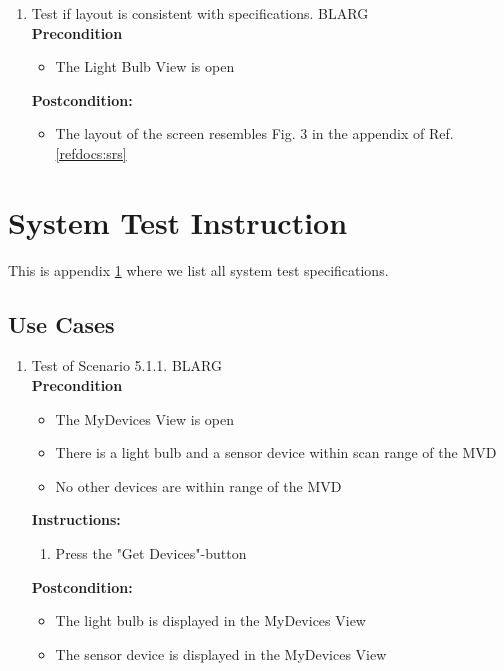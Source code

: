 \documentclass[a4paper]{article}
\newlength{\testlabellength}
\newenvironment{testlist}{\begin{enumerate}[label=\bfseries Instruction \thesubsection.\arabic* , labelindent=0pt, labelwidth=\testlabellength , leftmargin=2cm]}{\end{enumerate}}
\newenvironment{precondition}{
{\color{white}BLARG}\\ 
\textbf{Precondition}
\begin{itemize}[labelindent=0cm, labelwidth=2cm , leftmargin=1cm]
}
{\end{itemize}}
\newenvironment{instruction}{
\textbf{Instructions:}
\begin{enumerate}[label=\bfseries  \arabic*., labelindent=0cm, labelwidth=2cm , leftmargin=1cm]
}
{\end{enumerate}}
\newenvironment{postcondition}{
\textbf{Postcondition:}
\begin{itemize}[labelindent=0cm, labelwidth=2cm , leftmargin=1cm]
}
{\end{itemize}}
\begin{document}
\begin{appendices}
\begin{testlist}
	\item Test if layout is consistent with specifications.
		\begin{precondition}
			\item The Light Bulb View is open
		\end{precondition}
		\begin{postcondition}
			\item The layout of the screen resembles Fig. 3 in the appendix of Ref. \ref{refdocs:srs}
		\end{postcondition}

\end{testlist}	

\newpage

\section{System Test Instruction} \label{appendix:section:systemtest}
This is appendix \ref{appendix:section:systemtest} where we list all system test specifications.

\subsection{Use Cases}
\begin{testlist}
	\item Test of Scenario 5.1.1.
		\begin{precondition}
			\item The MyDevices View is open
			\item There is a light bulb and a sensor device within scan range of the MVD
			\item No other devices are within range of the MVD
		\end{precondition}
		\begin{instruction}
			\item Press the "Get Devices"-button
		\end{instruction}
		\begin{postcondition}
			\item The light bulb is displayed in the MyDevices View
		 	\item The sensor device is displayed in the MyDevices View
		\end{postcondition}


\end{testlist}
\end{appendices}
\end{document}
